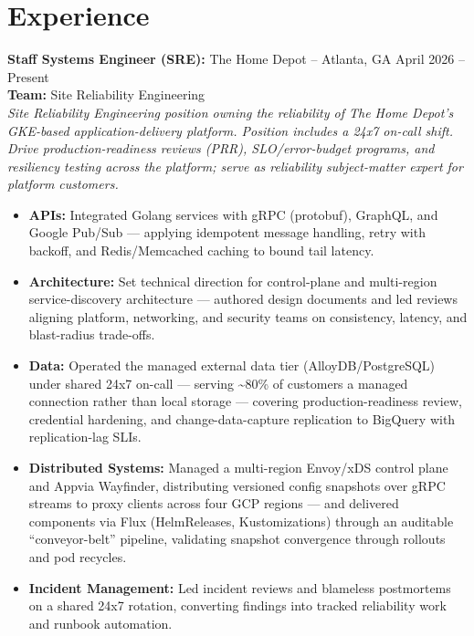 \documentclass[11pt]{article}       %
\begin{document}
\section*{Experience}
\begin{description}
\item\textbf{Staff Systems Engineer (SRE):} {The Home Depot} -- Atlanta, GA \hfill April 2026 -- Present \\
\textbf{Team:} Site Reliability Engineering \\
\textit{Site Reliability Engineering position owning the reliability of The Home Depot's GKE-based application-delivery platform. Position includes a 24x7 on-call shift. Drive production-readiness reviews (PRR), SLO/error-budget programs, and resiliency testing across the platform; serve as reliability subject-matter expert for platform customers.} \\
\vspace{-6.5pt}
\begin{itemize}
  \item \textbf{APIs:} Integrated Golang services with gRPC (protobuf), GraphQL, and Google Pub/Sub — applying idempotent message handling, retry with backoff, and Redis/Memcached caching to bound tail latency.
  \item \textbf{Architecture:} Set technical direction for control-plane and multi-region service-discovery architecture — authored design documents and led reviews aligning platform, networking, and security teams on consistency, latency, and blast-radius trade-offs.
  \item \textbf{Data:} Operated the managed external data tier (AlloyDB/PostgreSQL) under shared 24x7 on-call — serving \textasciitilde{}80\% of customers a managed connection rather than local storage — covering production-readiness review, credential hardening, and change-data-capture replication to BigQuery with replication-lag SLIs.
  \item \textbf{Distributed Systems:} Managed a multi-region Envoy/xDS control plane and Appvia Wayfinder, distributing versioned config snapshots over gRPC streams to proxy clients across four GCP regions — and delivered components via Flux (HelmReleases, Kustomizations) through an auditable ``conveyor-belt'' pipeline, validating snapshot convergence through rollouts and pod recycles.
  \item \textbf{Incident Management:} Led incident reviews and blameless postmortems on a shared 24x7 rotation, converting findings into tracked reliability work and runbook automation.

\end{itemize}
\end{description}
\end{document}
